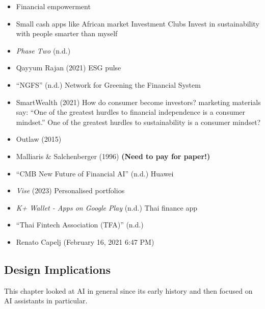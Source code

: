 \documentclass[
  letterpaper,
  DIV=11,
  numbers=noendperiod]{scrartcl}
\begin{document}
\begin{itemize}
\item
  Financial empowerment
\item
  Small cash apps like African market Investment Clubs Invest in
  sustainability with people smarter than myself
\item
  \emph{Phase {Two}} (n.d.)
\item
  Qayyum Rajan (2021) ESG pulse
\item
  {``{NGFS}''} (n.d.) Network for Greening the Financial System
\item
  SmartWealth (2021) How do consumer become investors? marketing
  materials say: ``One of the greatest hurdles to financial independence
  is a consumer mindset.'' One of the greatest hurdles to sustainability
  is a consumer mindset?
\item
  Outlaw (2015)
\item
  Malliaris \& Salchenberger (1996) \textbf{(Need to pay for paper!)}
\item
  {``{CMB} {\textbar} {New Future} of {Financial AI}''} (n.d.) Huawei
\item
  \emph{Vise} (2023) Personalised portfolios
\item
  \emph{K+ {Wallet} - {Apps} on {Google Play}} (n.d.) Thai finance app
\item
  {``Thai {Fintech Association} ({TFA})''} (n.d.)
\item
  Renato Capelj (February 16, 2021 6:47 PM)
\end{itemize}

\subsection{Design Implications}\label{design-implications-3}

This chapter looked at AI in general since its early history and then
focused on AI assistants in particular.
\end{document}

